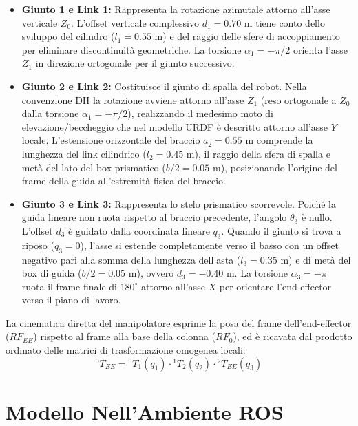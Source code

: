 \documentclass[11pt, a4paper]{report}
\begin{document}
\begin{itemize}
    \item \textbf{Giunto 1 e Link 1:} Rappresenta la rotazione azimutale attorno all'asse verticale \(Z_0\). L'offset verticale complessivo \(d_1 = 0.70\) m tiene conto dello sviluppo del cilindro (\(l_1 = 0.55\) m) e del raggio delle sfere di accoppiamento per eliminare discontinuità geometriche. La torsione \(\alpha_1 = -\pi/2\) orienta l'asse \(Z_1\) in direzione ortogonale per il giunto successivo.

    \item \textbf{Giunto 2 e Link 2:} Costituisce il giunto di spalla del robot. Nella convenzione DH la rotazione avviene attorno all'asse \(Z_1\) (reso ortogonale a \(Z_0\) dalla torsione \(\alpha_1 = -\pi/2\)), realizzando il medesimo moto di elevazione/beccheggio che nel modello URDF è descritto attorno all'asse \(Y\) locale. L'estensione orizzontale del braccio \(a_2 = 0.55\) m comprende la lunghezza del link cilindrico (\(l_2 = 0.45\) m), il raggio della sfera di spalla e metà del lato del box prismatico (\(b/2 = 0.05\) m), posizionando l'origine del frame della guida all'estremità fisica del braccio.

    \item \textbf{Giunto 3 e Link 3:} Rappresenta lo stelo prismatico scorrevole. Poiché la guida lineare non ruota rispetto al braccio precedente, l'angolo \(\theta_3\) è nullo. L'offset \(d_3\) è guidato dalla coordinata lineare \(q_3\). Quando il giunto si trova a riposo (\(q_3 = 0\)), l'asse si estende completamente verso il basso con un offset negativo pari alla somma della lunghezza dell'asta (\(l_3 = 0.35\) m) e di metà del box di guida (\(b/2 = 0.05\) m), ovvero \(d_3 = -0.40\) m. La torsione \(\alpha_3 = -\pi\) ruota il frame finale di \(180^\circ\) attorno all'asse \(X\) per orientare l'end-effector verso il piano di lavoro.
\end{itemize}

La cinematica diretta del manipolatore esprime la posa del frame dell'end-effector (\(RF_{EE}\)) rispetto al frame alla base della colonna (\(RF_0\)), ed è ricavata dal prodotto ordinato delle matrici di trasformazione omogenea locali:
\[
    ^{0}T_{EE} = {^{0}T_1}(q_1) \cdot {^{1}T_2}(q_2) \cdot {^{2}T_{EE}}(q_3)
\]


\section{Modello Nell'Ambiente ROS}
\label{sec:implementazione_ros}
\end{document}

